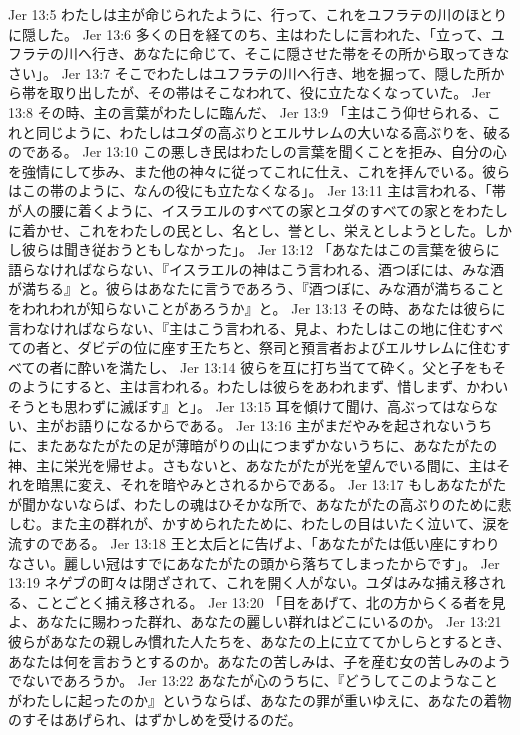 Jer 13:5  わたしは主が命じられたように、行って、これをユフラテの川のほとりに隠した。
Jer 13:6  多くの日を経てのち、主はわたしに言われた、「立って、ユフラテの川へ行き、あなたに命じて、そこに隠させた帯をその所から取ってきなさい」。
Jer 13:7  そこでわたしはユフラテの川へ行き、地を掘って、隠した所から帯を取り出したが、その帯はそこなわれて、役に立たなくなっていた。
Jer 13:8  その時、主の言葉がわたしに臨んだ、
Jer 13:9  「主はこう仰せられる、これと同じように、わたしはユダの高ぶりとエルサレムの大いなる高ぶりを、破るのである。
Jer 13:10  この悪しき民はわたしの言葉を聞くことを拒み、自分の心を強情にして歩み、また他の神々に従ってこれに仕え、これを拝んでいる。彼らはこの帯のように、なんの役にも立たなくなる」。
Jer 13:11  主は言われる、「帯が人の腰に着くように、イスラエルのすべての家とユダのすべての家とをわたしに着かせ、これをわたしの民とし、名とし、誉とし、栄えとしようとした。しかし彼らは聞き従おうともしなかった」。
Jer 13:12  「あなたはこの言葉を彼らに語らなければならない、『イスラエルの神はこう言われる、酒つぼには、みな酒が満ちる』と。彼らはあなたに言うであろう、『酒つぼに、みな酒が満ちることをわれわれが知らないことがあろうか』と。
Jer 13:13  その時、あなたは彼らに言わなければならない、『主はこう言われる、見よ、わたしはこの地に住むすべての者と、ダビデの位に座す王たちと、祭司と預言者およびエルサレムに住むすべての者に酔いを満たし、
Jer 13:14  彼らを互に打ち当てて砕く。父と子をもそのようにすると、主は言われる。わたしは彼らをあわれまず、惜しまず、かわいそうとも思わずに滅ぼす』と」。
Jer 13:15  耳を傾けて聞け、高ぶってはならない、主がお語りになるからである。
Jer 13:16  主がまだやみを起されないうちに、またあなたがたの足が薄暗がりの山につまずかないうちに、あなたがたの神、主に栄光を帰せよ。さもないと、あなたがたが光を望んでいる間に、主はそれを暗黒に変え、それを暗やみとされるからである。
Jer 13:17  もしあなたがたが聞かないならば、わたしの魂はひそかな所で、あなたがたの高ぶりのために悲しむ。また主の群れが、かすめられたために、わたしの目はいたく泣いて、涙を流すのである。
Jer 13:18  王と太后とに告げよ、「あなたがたは低い座にすわりなさい。麗しい冠はすでにあなたがたの頭から落ちてしまったからです」。
Jer 13:19  ネゲブの町々は閉ざされて、これを開く人がない。ユダはみな捕え移される、ことごとく捕え移される。
Jer 13:20  「目をあげて、北の方からくる者を見よ、あなたに賜わった群れ、あなたの麗しい群れはどこにいるのか。
Jer 13:21  彼らがあなたの親しみ慣れた人たちを、あなたの上に立ててかしらとするとき、あなたは何を言おうとするのか。あなたの苦しみは、子を産む女の苦しみのようでないであろうか。
Jer 13:22  あなたが心のうちに、『どうしてこのようなことがわたしに起ったのか』というならば、あなたの罪が重いゆえに、あなたの着物のすそはあげられ、はずかしめを受けるのだ。
